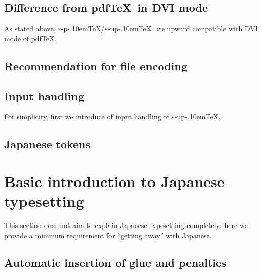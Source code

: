 \documentclass[a4paper,11pt]{article}
\let\emph=\origemph
\def\epTeX{$\varepsilon$-\pTeX}\def\eTeX{$\varepsilon$-\TeX}
\def\eupTeX{$\varepsilon$-\upTeX}\def\upTeX{u\pTeX}
\def\pTeX{p\kern-.10em\TeX}
\def\pdfTeX{pdf\TeX}
\begin{document}
\subsection{Difference from \pdfTeX\ in DVI mode}\label{dvi-pdftex}

As stated above,
\epTeX/\eupTeX\ are \emph{not} upward compatible with DVI mode of \pdfTeX.


\subsection{Recommendation for file encoding}


\subsection{Input handling}

For simplicity, first we introduce of input handling of \eupTeX.


\subsection{Japanese tokens}

\section{Basic introduction to Japanese typesetting}

This section does not aim to explain Japanese typesetting completely;
here we provide a minimum requirement for ``getting away'' with Japanese.

\subsection{Automatic insertion of glue and penalties}
\end{document}
